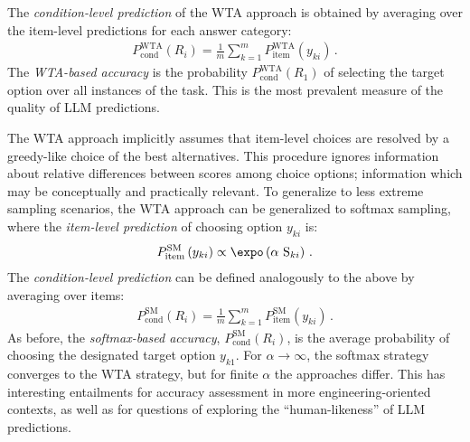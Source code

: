 \documentclass[fleqn]{article}
\begin{document}
The \emph{condition-level prediction} of the WTA approach is obtained by averaging over the item-level predictions for each answer category:
%
\begin{align*}
  P_{\text{cond}}^{\text{WTA}}\left(R_{i} \right) = \frac{1}{m} \sum_{k = 1}^{m} P_{\text{item}}^{\text{WTA}} \left(y_{ki} \right)\,.
\end{align*}
%
The \emph{WTA-based accuracy} is the probability $P_{\text{cond}}^{\text{WTA}}\left(R_{1} \right)$ of selecting the target option over all instances of the task.
This is the most prevalent measure of the quality of LLM predictions.


The WTA approach implicitly assumes that item-level choices are resolved by a greedy-like choice of the best alternatives.
This procedure ignores information about relative differences between scores among choice options; information which may be conceptually and practically relevant.
To generalize to less extreme sampling scenarios, the WTA approach can be generalized to softmax sampling, where the \emph{item-level prediction} of choosing option $y_{ki}$ is:
%
\begin{align*}
P_{\text{item}}^{\text{SM}}\left ( y_{ki} \right ) \propto \expo \left (\alpha \ \text{S}_{ki} \right)\,.
\end{align*}
%
The \emph{condition-level prediction} can be defined analogously to the above by averaging over items:
\begin{align*}
  P_{\text{cond}}^{\text{SM}}\left(R_{i} \right) = \frac{1}{m} \sum_{k = 1}^{m} P_{\text{item}}^{\text{SM}} \left(y_{ki} \right)\,.
\end{align*}
As before, the \emph{softmax-based accuracy}, $P_{\text{cond}}^{\text{SM}}\left(R_{i} \right)$, is the average probability of choosing the designated target option $y_{k1}$.
For $\alpha \rightarrow \infty$, the softmax strategy converges to the WTA strategy, but for finite $\alpha$ the approaches differ.
This has interesting entailments for accuracy assessment in more engineering-oriented contexts, as well as for questions of exploring the ``human-likeness'' of LLM predictions.
\end{document}
